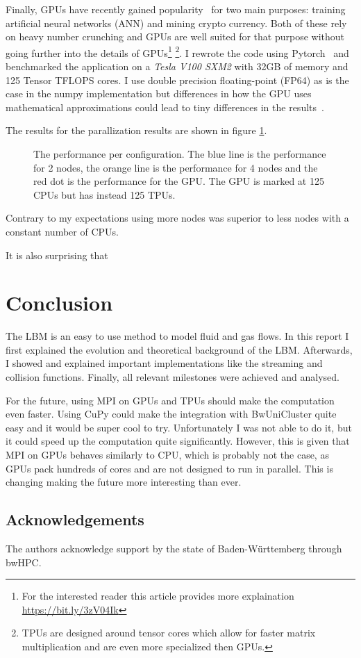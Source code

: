 \documentclass[a4paper,11pt, oneside]{book}
\begin{document}
Finally, GPUs have recently gained popularity~\cite{boyer2013gpu-pop} for two main purposes: training artificial neural networks (ANN) and mining crypto currency. 
Both of these rely on heavy number crunching and GPUs are well suited for that purpose without going further into the details of GPUs\footnote{For the interested reader this article provides more explaination \url{https://bit.ly/3zV04Ik}}
\footnote{TPUs are designed around tensor cores which allow for faster matrix multiplication and are even more specialized then GPUs.}.
I rewrote the code using Pytorch~\cite{pytorch} and benchmarked the application on a \textit{Tesla V100 SXM2} with 32GB of memory and 125 Tensor TFLOPS cores.
I use double precision floating-point (FP64) as is the case in the numpy implementation but differences in how the GPU uses mathematical approximations could lead to tiny differences in the results~\cite{precision-nvidia}.

The results for the parallization results are shown in figure \ref{fig:m7}.
\begin{figure}[ht]
\centering
\resizebox{\columnwidth}{!}{\large}
\caption[Performance per configuration.]{The performance per configuration. The blue line is the performance for 2 nodes, the orange line is the performance for 4 nodes and the red dot is the performance for the GPU. The GPU is marked at 125 CPUs but has instead 125 TPUs.}
\label{fig:m7}
\end{figure}
Contrary to my expectations using more nodes was superior to less nodes with a constant number of CPUs. 

It is also surprising that

\chapter{Conclusion}
The LBM is an easy to use method to model fluid and gas flows. In this report I first explained the evolution and theoretical background of the LBM. 
Afterwards, I showed and explained important implementations like the streaming and collision functions.
Finally, all relevant milestones were achieved and analysed.

For the future, using MPI on GPUs and TPUs should make the computation even faster.
Using CuPy could make the integration with BwUniCluster quite easy and it would be super cool to try. Unfortunately I was not able to do it, but it could speed up the computation quite significantly.
However, this is given that MPI on GPUs behaves similarly to CPU, which is probably not the case, as GPUs pack hundreds of cores and are not designed to run in parallel. 
This is changing making the future more interesting than ever.







\section{Acknowledgements}
The authors acknowledge support by the state of Baden-Württemberg through bwHPC.



\end{document}
